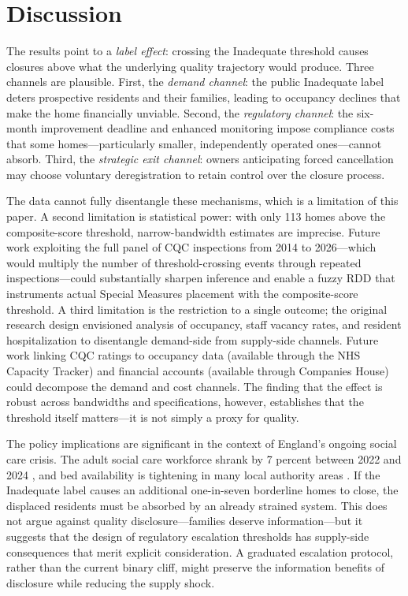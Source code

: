 \documentclass[12pt]{article}
\begin{document}
\section{Discussion}

The results point to a \emph{label effect}: crossing the Inadequate threshold causes closures above what the underlying quality trajectory would produce. Three channels are plausible. First, the \emph{demand channel}: the public Inadequate label deters prospective residents and their families, leading to occupancy declines that make the home financially unviable. Second, the \emph{regulatory channel}: the six-month improvement deadline and enhanced monitoring impose compliance costs that some homes---particularly smaller, independently operated ones---cannot absorb. Third, the \emph{strategic exit channel}: owners anticipating forced cancellation may choose voluntary deregistration to retain control over the closure process.

The data cannot fully disentangle these mechanisms, which is a limitation of this paper. A second limitation is statistical power: with only 113 homes above the composite-score threshold, narrow-bandwidth estimates are imprecise. Future work exploiting the full panel of CQC inspections from 2014 to 2026---which would multiply the number of threshold-crossing events through repeated inspections---could substantially sharpen inference and enable a fuzzy RDD that instruments actual Special Measures placement with the composite-score threshold. A third limitation is the restriction to a single outcome; the original research design envisioned analysis of occupancy, staff vacancy rates, and resident hospitalization to disentangle demand-side from supply-side channels. Future work linking CQC ratings to occupancy data (available through the NHS Capacity Tracker) and financial accounts (available through Companies House) could decompose the demand and cost channels. The finding that the effect is robust across bandwidths and specifications, however, establishes that the threshold itself matters---it is not simply a proxy for quality.

The policy implications are significant in the context of England's ongoing social care crisis. The adult social care workforce shrank by 7 percent between 2022 and 2024 \citep{skills2023workforce}, and bed availability is tightening in many local authority areas \citep{kingsfund2023social}. If the Inadequate label causes an additional one-in-seven borderline homes to close, the displaced residents must be absorbed by an already strained system. This does not argue against quality disclosure---families deserve information---but it suggests that the design of regulatory escalation thresholds has supply-side consequences that merit explicit consideration. A graduated escalation protocol, rather than the current binary cliff, might preserve the information benefits of disclosure while reducing the supply shock.
\end{document}
